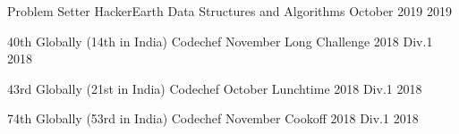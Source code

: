 \begin{cvhonors}








\cvhonor
{Problem Setter} %
{HackerEarth Data Structures and Algorithms October 2019} %
{} %
{2019} %




\cvhonor
{40th Globally (14th in India)} %
{Codechef November Long Challenge 2018 Div.1} %
{} %
{2018} %


\cvhonor
{43rd Globally (21st in India)} %
{Codechef October Lunchtime 2018 Div.1} %
{} %
{2018} %


\cvhonor
{74th Globally (53rd in India)} %
{Codechef November Cookoff 2018 Div.1} %
{} %
{2018} %






\end{cvhonors}
